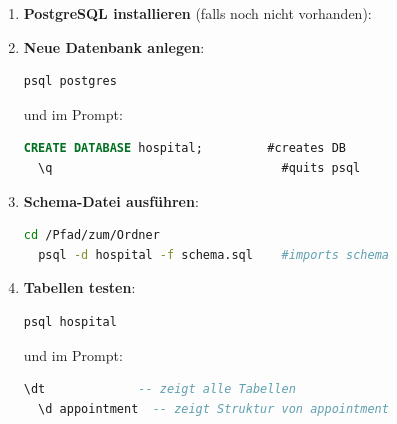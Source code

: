 \documentclass{article}
\begin{document}
\begin{enumerate}
  \item \textbf{PostgreSQL installieren} (falls noch nicht vorhanden):\\

  \item \textbf{Neue Datenbank anlegen}:\\
  \begin{lstlisting}[language=bash]
  psql postgres
  \end{lstlisting}
  und im Prompt:
  \begin{lstlisting}[language=SQL]
  CREATE DATABASE hospital;         #creates DB
  \q                                #quits psql
  \end{lstlisting}

  \item \textbf{Schema-Datei ausführen}:\\
  \begin{lstlisting}[language=bash]
  cd /Pfad/zum/Ordner
  psql -d hospital -f schema.sql    #imports schema
  \end{lstlisting}

  \item \textbf{Tabellen testen}:\\
  \begin{lstlisting}[language=bash]
  psql hospital       
  \end{lstlisting}
  und im Prompt:
  \begin{lstlisting}[language=SQL]
  \dt             -- zeigt alle Tabellen
  \d appointment  -- zeigt Struktur von appointment
  \end{lstlisting}
\end{enumerate}
\end{document}
